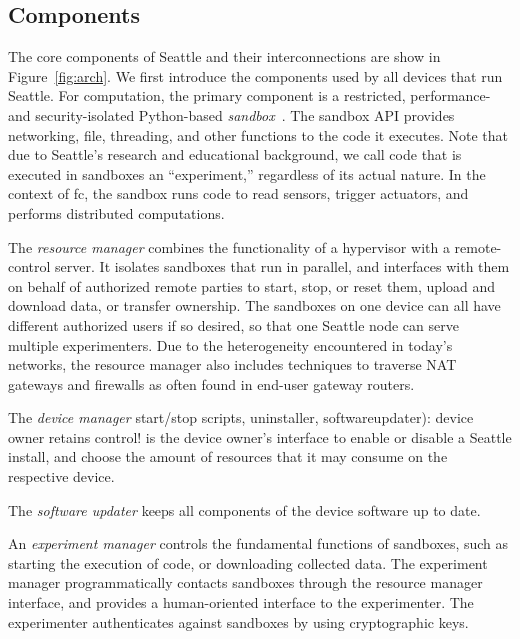 \subsection{Components}\label{sec-components}

The core components of Seattle and their interconnections are
show in Figure~\ref{fig:arch}.
We first introduce the components used by all devices that
run Seattle.
For computation, the primary component is a restricted,
performance- and security-isolated Python-based
\textit{sandbox}~\cite{RepySandbox,li2015fence}.
The sandbox \gls{API} provides
networking, file, threading, and other functions to
the code it executes. Note that
due to Seattle's research and educational background, we
call code that is executed in sandboxes an ``experiment,''
regardless of its actual nature.
In the context of \gls{fc}, the sandbox runs code to read
sensors, trigger actuators, and performs distributed computations.

The \textit{resource manager} combines the functionality of
a hypervisor with a remote-control server.
It isolates %
sandboxes that run in
parallel, and interfaces with them on behalf of authorized remote
parties to start, stop, or reset them, upload and download data,
or transfer ownership. The sandboxes on one
device can all have different authorized users if so desired,
so that one Seattle node can serve multiple experimenters.
Due to the heterogeneity encountered in today's networks,
the resource manager also includes techniques to traverse
\gls{NAT} gateways and firewalls as often found in end-user
gateway routers.

The \textit{device manager} %
start/stop scripts, uninstaller, softwareupdater): device owner retains control!
is the device owner's interface to enable or disable a Seattle
install, and choose the amount of resources that it may consume on the respective
device.

The \textit{software updater} keeps all components of the
device software up to date.

An \textit{experiment manager} controls the fundamental functions of sandboxes, such as
starting the execution of code, or downloading collected data.
The experiment manager programmatically contacts sandboxes
through the resource manager interface, and provides a
human-oriented interface to the experimenter. The experimenter
authenticates against sandboxes by using cryptographic keys.

